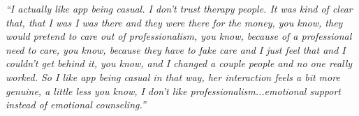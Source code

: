                 \textit{
                ``I actually like \acl{app} being casual. I don't trust therapy people.
                It was kind of clear that, that I was I was there and they were there for the money, you know, they would pretend to care out of professionalism, you know, because of a professional need to care, you know, because they have to fake care and I just feel that and I couldn't get behind it, you know, and I changed a couple people and no one really worked. So I like \acl{app} being casual in that way, her interaction feels a bit more genuine, a little less you know, I don't like professionalism...emotional support instead of emotional counseling.''
                }
        
